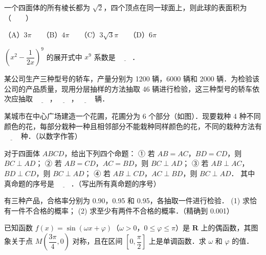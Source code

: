 \begin{question}
一个四面体的所有棱长都为 $\sqrt{2}$，四个顶点在同一球面上，则此球的表面积为\mbox{（　　）}

（A）$3\pi$　　（B）$4\pi$　　（C）$3\sqrt{3}\pi$　　（D）$6\pi$

\end{question}
\begin{question}
$\left(x^2 - \dfrac{1}{2x}\right)^9$ 的展开式中 $x^9$ 系数是 $\underline{\hspace{2em}}$．

\end{question}
\begin{question}
某公司生产三种型号的轿车，产量分别为 1200 辆，6000 辆和 2000 辆．为检验该公司的产品质量，现用分层抽样的方法抽取 46 辆进行检验，这三种型号的轿车依次应抽取 $\underline{\hspace{2em}}$，$\underline{\hspace{2em}}$，$\underline{\hspace{2em}}$ 辆．

\Needspace{0.4\textheight}
\end{question}
\begin{question}
某城市在中心广场建造一个花圃，花圃分为 6 个部分（如图）．现要栽种 4 种不同颜色的花，每部分栽种一种且相邻部分不能栽种同样颜色的花，不同的栽种方法有 $\underline{\hspace{2em}}$ 种．（以数字作答）
\nopagebreak[4]
\begin{center}\end{center}
\nopagebreak[4]
\end{question}
\begin{question}
对于四面体 $ABCD$，给出下列四个命题：
① 若 $AB = AC$，$BD = CD$，则 $BC \perp AD$；
② 若 $AB = CD$，$AC = BD$，则 $BC \perp AD$；
③ 若 $AB \perp AC$，$BD \perp CD$，则 $BC \perp AD$；
④ 若 $AB \perp CD$，$AC \perp BD$，则 $BC \perp AD$．
其中真命题的序号是 $\underline{\hspace{2em}}$．（写出所有真命题的序号）

\end{question}
\begin{question}
有三种产品，合格率分别为 0.90，0.95 和 0.95，各抽取一件进行检验．
(1) 求恰有一件不合格的概率；
(2) 求至少有两件不合格的概率．（精确到 0.001）

\end{question}
\begin{question}
已知函数 $f(x) = \sin(\omega x + \varphi)$（$\omega > 0$，$0 \le \varphi \le \pi$）是 $\mathbf{R}$ 上的偶函数，其图象关于点 $M\left(\dfrac{3\pi}{4}, 0\right)$ 对称，且在区间 $\left[0, \dfrac{\pi}{2}\right]$ 上是单调函数．求 $\omega$ 和 $\varphi$ 的值．

\Needspace{0.4\textheight}
\end{question}
